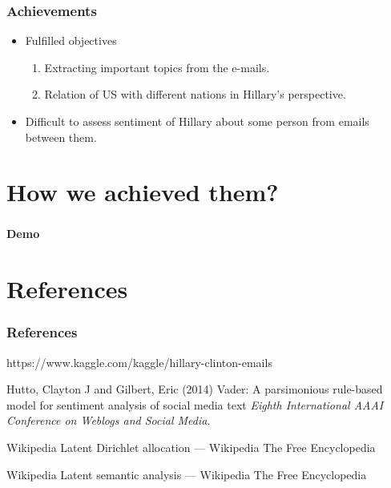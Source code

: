 \documentclass{beamer}
\begin{document}

\begin{frame}
	\frametitle{Achievements}
	\begin{itemize}
		\item Fulfilled objectives
		\begin{enumerate}
			\item Extracting important topics from the e-mails.
			\item Relation of US with different nations in Hillary's perspective.
		\end{enumerate}
		\item Difficult to assess sentiment of Hillary about some person from emails between them.
	\end{itemize}
\end{frame}


\section{How we achieved them?}

\begin{frame}
	\frametitle{}
	\begin{center}
		\textbf{Demo}
	\end{center}
\end{frame}

\section{References}

\begin{frame}
	\frametitle{References}
	\footnotesize{
		\begin{thebibliography}{99} %
			 https://www.kaggle.com/kaggle/hillary-clinton-emails
			
			 Hutto, Clayton J and Gilbert, Eric (2014)
			\newblock Vader: A parsimonious rule-based model for sentiment analysis of social media text
			\newblock \emph{Eighth International AAAI Conference on Weblogs and Social Media}.
			
			 Wikipedia
			\newblock Latent Dirichlet allocation --- Wikipedia The Free Encyclopedia
			
			 Wikipedia
			\newblock Latent semantic analysis --- Wikipedia The Free Encyclopedia
		\end{thebibliography}
	}	
\end{frame}
\end{document}
